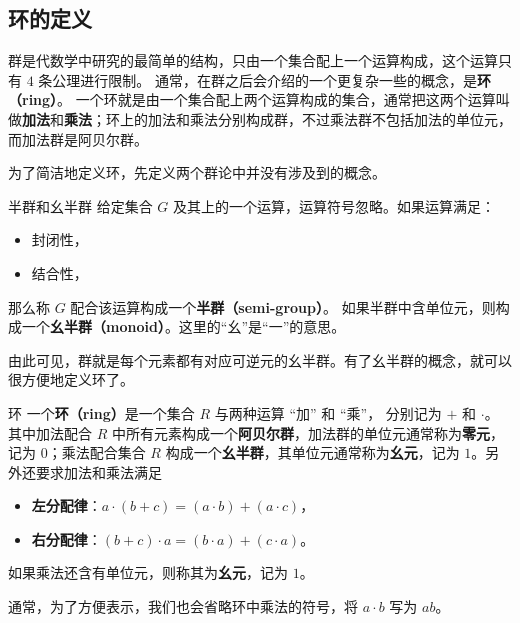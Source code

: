 


\subsection{环的定义}
群是代数学中研究的最简单的结构，只由一个集合配上一个运算构成，这个运算只有 $4$ 条公理进行限制。 通常，在群之后会介绍的一个更复杂一些的概念，是\textbf{环（ring）}。 一个环就是由一个集合配上两个运算构成的集合，通常把这两个运算叫做\textbf{加法}和\textbf{乘法}；环上的加法和乘法分别构成群，不过乘法群不包括加法的单位元，而加法群是阿贝尔群。

为了简洁地定义环，先定义两个群论中并没有涉及到的概念。

\begin{definition}{半群和幺半群}\label{def_Ring_1}
给定集合 $G$ 及其上的一个运算，运算符号忽略。如果运算满足：
\begin{itemize}
\item 封闭性，
\item 结合性，
\end{itemize}
那么称 $G$ 配合该运算构成一个\textbf{半群（semi-group）}。
如果半群中含单位元，则构成一个\textbf{幺半群（monoid）}。这里的“幺”是“一”的意思。
\end{definition}

由此可见，群就是每个元素都有对应可逆元的幺半群。有了幺半群的概念，就可以很方便地定义环了。

\begin{definition}{环}\label{def_Ring_2}
一个\textbf{环（ring）}是一个集合 $R$ 与两种运算 “加” 和 “乘”， 分别记为 $+$ 和 $\cdot$。 其中加法配合 $R$ 中所有元素构成一个\textbf{阿贝尔群}，加法群的单位元通常称为\textbf{零元}，记为 $0$；乘法配合集合 $R$ 构成一个\textbf{幺半群}，其单位元通常称为\textbf{幺元}，记为 $1$。另外还要求加法和乘法满足
\begin{itemize}
\item \textbf{左分配律}：$a \cdot (b + c) = (a \cdot b) + (a \cdot c)$，
\item \textbf{右分配律}：$(b + c) \cdot a = (b \cdot a) + (c \cdot a)$。
\end{itemize}
如果乘法还含有单位元，则称其为\textbf{幺元}，记为 $1$。
\end{definition}

通常，为了方便表示，我们也会省略环中乘法的符号，将 $a\cdot b$ 写为 $ab$。

